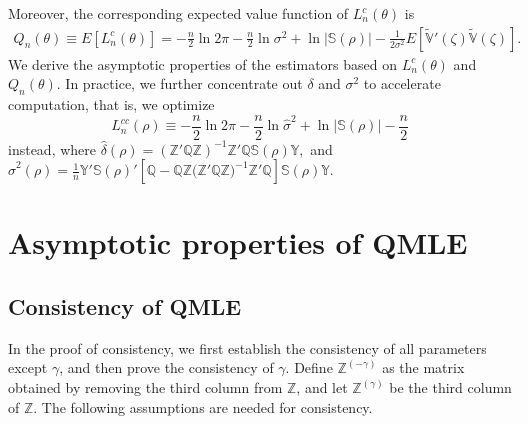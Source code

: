 \documentclass[11pt,a4paper]{article}
\begin{document}
Moreover, the corresponding expected value function of $L_n^c(\theta)$ is
\begin{align}
Q_n(\theta)\equiv E[L_n^c(\theta)]=-\frac{n}{2}\ln2\pi-\frac{n}{2}\ln\sigma^2+\ln\left|\mathbb{S}(\rho)\right|-\frac{1}{2\sigma^2}E\left[\widetilde{\mathbb{V}}'(\zeta)\widetilde{\mathbb{V}}(\zeta)\right].\label{eq_Q_n}
\end{align}
We derive the asymptotic properties of the estimators based on $L_n^c(\theta)$ and $Q_n(\theta)$. In practice, we further concentrate out $\delta$ and $\sigma^2$ to accelerate computation, that is, we optimize $$L_{n}^{cc}(\rho)\equiv-\frac{n}{2}\ln2\pi-\frac{n}{2}\ln\hat{\sigma}^2+\ln|\mathbb{S}(\rho)|-\frac{n}{2}$$ instead, where
$\hat{\delta}(\rho)
=\left(\mathbb{Z}'\mathbb{Q}\mathbb{Z}
\right)^{-1}\mathbb{Z}'\mathbb{Q}\mathbb{S}(\rho)\mathbb{Y},$ and
$\hat{\sigma}^2(\rho)=\frac{1}{n}\mathbb{Y'S(\rho)}'[\mathbb{Q}-\mathbb{QZ(Z'QZ})^{-1}\mathbb{Z'Q}]\mathbb{S(\rho)Y}$.


\section{Asymptotic properties of QMLE}\label{section3}
\subsection{Consistency of QMLE}
In the proof of consistency, we first establish the consistency of all parameters except $\gamma$, and then prove the consistency of $\gamma$.
Define $\mathbb{Z}^{(-\gamma)}$ as the matrix obtained by removing the third column from $\mathbb{Z}$, and let $\mathbb{Z}^{(\gamma)}$ be the third column of $\mathbb{Z}$.
The following assumptions are needed for consistency.
\end{document}
